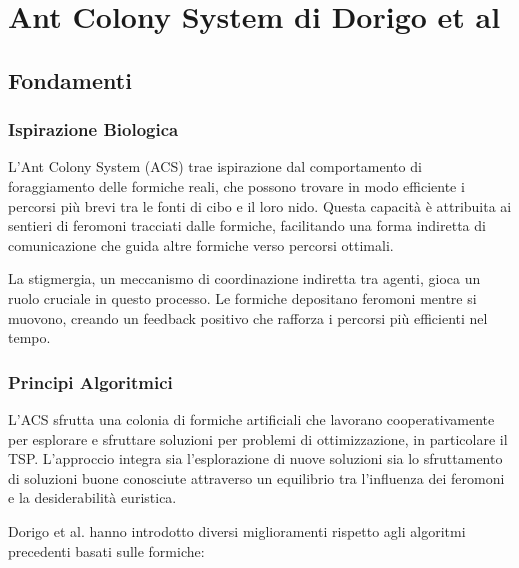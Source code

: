 
%

\chapter{Ant Colony System di Dorigo et al}\label{chapt:5}



\section{Fondamenti}

\subsection{Ispirazione Biologica}
L'Ant Colony System (\gls{ACS}) trae ispirazione dal comportamento di foraggiamento delle formiche reali, che possono trovare in modo efficiente i percorsi più brevi tra le fonti di cibo e il loro nido. Questa capacità è attribuita ai sentieri di feromoni tracciati dalle formiche, facilitando una forma indiretta di comunicazione che guida altre formiche verso percorsi ottimali\cite{Dorigo1996, Dorigo1997}.

La stigmergia, un meccanismo di coordinazione indiretta tra agenti, gioca un ruolo cruciale in questo processo\cite{Bonabeau1999}. Le formiche depositano feromoni mentre si muovono, creando un feedback positivo che rafforza i percorsi più efficienti nel tempo\cite{Deneubourg1990}.

\subsection{Principi Algoritmici}
L'\gls{ACS} sfrutta una colonia di formiche artificiali che lavorano cooperativamente per esplorare e sfruttare soluzioni per problemi di ottimizzazione, in particolare il \gls{TSP}. L'approccio integra sia l'esplorazione di nuove soluzioni sia lo sfruttamento di soluzioni buone conosciute attraverso un equilibrio tra l'influenza dei feromoni e la desiderabilità euristica.\cite{Dorigo1996, Dorigo1997}

Dorigo et al. hanno introdotto diversi miglioramenti rispetto agli algoritmi precedenti basati sulle formiche:

